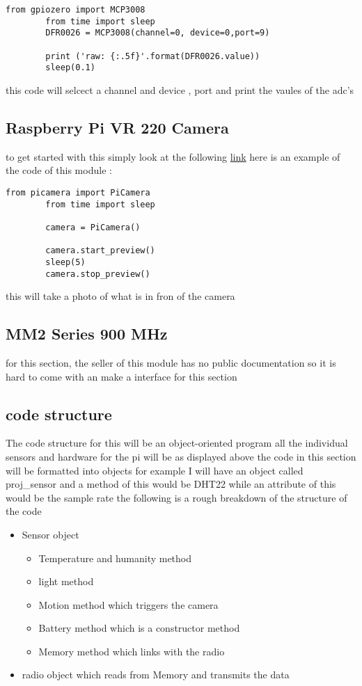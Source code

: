 	\label{adc code}
	\begin{lstlisting}[style=mystyle,caption={ADC code}]
		from gpiozero import MCP3008
		from time import sleep
		DFR0026 = MCP3008(channel=0, device=0,port=9)
	
		print ('raw: {:.5f}'.format(DFR0026.value))
		sleep(0.1)
	\end{lstlisting}
	this code will  selcect a  channel and device , port and  print the vaules of the adc's
	\subsection{Raspberry Pi VR 220 Camera}
	to get started with this simply look at the following \href{https://projects.raspberrypi.org/en/projects/getting-started-with-picamera/4}{link}
	here is an example of the code of this module :
	\begin{lstlisting}[style=mystyle,caption={example code for camera}]
		from picamera import PiCamera
		from time import sleep

		camera = PiCamera()

		camera.start_preview()
		sleep(5)
		camera.stop_preview()
	\end{lstlisting}
	this will  take a photo of what is in fron of the  camera

	\subsection{MM2 Series 900 MHz}
	for this section, the seller of this module has no public  documentation so it is hard to  come  with  an make a  interface for  this section   
	\subsection{code structure}
	The code structure for this  will be an object-oriented program all the individual sensors and  hardware  for the pi will be as displayed above the code in this section will be formatted into objects for example I will have an  object   called proj\_sensor and  a method of this  would be  DHT22 while an attribute of this would  be  the  sample rate
	the following is a  rough breakdown of the  structure of the code
	\begin{itemize}
		\item Sensor object
		
		\begin{itemize}
			\item Temperature and humanity method
			\item light method
			\item Motion method which triggers the camera
			\item Battery method which is a constructor method
			\item Memory method which  links with the radio 
		
		\end{itemize}
		
		\item radio object which reads from Memory and  transmits the data 
	
	\end{itemize}
